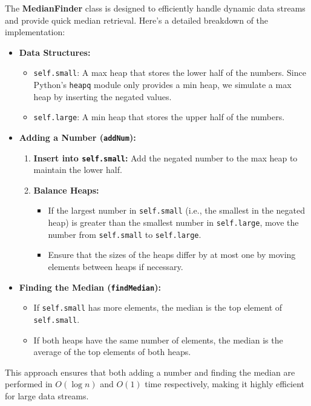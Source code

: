 The \textbf{MedianFinder} class is designed to efficiently handle dynamic data streams and provide quick median retrieval. Here's a detailed breakdown of the implementation:

\begin{itemize}
    \item \textbf{Data Structures:}
    \begin{itemize}
        \item \texttt{self.small}: A max heap that stores the lower half of the numbers. Since Python's \texttt{heapq} module only provides a min heap, we simulate a max heap by inserting the negated values.
        \item \texttt{self.large}: A min heap that stores the upper half of the numbers.
    \end{itemize}
    
    \item \textbf{Adding a Number (\texttt{addNum}):}
    \begin{enumerate}
        \item \textbf{Insert into \texttt{self.small}:} Add the negated number to the max heap to maintain the lower half.
        \item \textbf{Balance Heaps:}
        \begin{itemize}
            \item If the largest number in \texttt{self.small} (i.e., the smallest in the negated heap) is greater than the smallest number in \texttt{self.large}, move the number from \texttt{self.small} to \texttt{self.large}.
            \item Ensure that the sizes of the heaps differ by at most one by moving elements between heaps if necessary.
        \end{itemize}
    \end{enumerate}
    
    \item \textbf{Finding the Median (\texttt{findMedian}):}
    \begin{itemize}
        \item If \texttt{self.small} has more elements, the median is the top element of \texttt{self.small}.
        \item If both heaps have the same number of elements, the median is the average of the top elements of both heaps.
    \end{itemize}
\end{itemize}

This approach ensures that both adding a number and finding the median are performed in \(O(\log n)\) and \(O(1)\) time respectively, making it highly efficient for large data streams.

